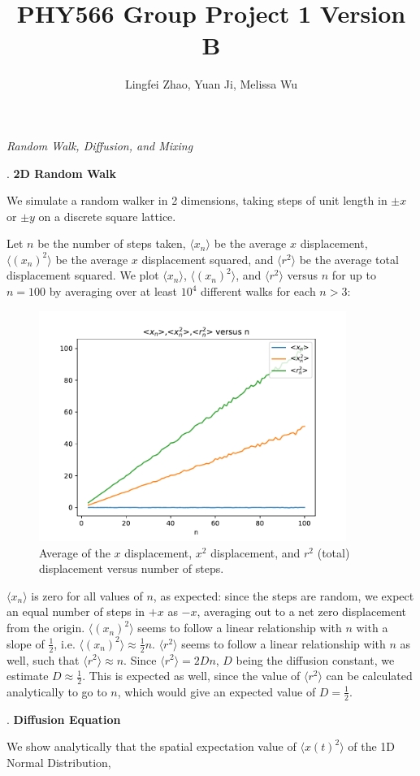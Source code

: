 \documentclass{article}
\begin{document}
\title{PHY566 Group Project 1 Version B}
\author{Lingfei Zhao, Yuan Ji, Melissa Wu}
\maketitle

\begin{center}
\textit{\large Random Walk, Diffusion, and Mixing}\par
\end{center}
. \textbf{2D Random Walk}\par
\smallskip
We simulate a random walker in 2 dimensions, taking steps of unit length in $\pm x$ or $\pm y$ on a discrete square lattice.\par
Let $n$ be the number of steps taken, $\langle x_{n} \rangle$ be the average $x$ displacement, $\langle (x_{n})^{2} \rangle$ be the average $x$ displacement squared, and $\langle r^{2} \rangle$ be the average total displacement squared. We plot $\langle x_{n} \rangle$, $\langle (x_{n})^{2} \rangle$, and $\langle r^{2} \rangle$ versus $n$ for up to $n = 100$ by averaging over at least $10^{4}$ different walks for each $n > 3$:\par
\begin{figure}[H]
\centering
\includegraphics[width=10cm]{P1_Yuan.pdf}
\caption{Average of the $x$ displacement, $x^{2}$ displacement, and $r^{2}$ (total) displacement versus number of steps.}
\end{figure}
$\langle x_{n} \rangle$ is zero for all values of $n$, as expected: since the steps are random, we expect an equal number of steps in $+x$ as $-x$, averaging out to a net zero displacement from the origin. $\langle(x_{n})^{2} \rangle$ seems to follow a linear relationship with $n$ with a slope of $\frac{1}{2}$, i.e. $\langle(x_{n})^{2} \rangle \approx \frac{1}{2}n$. $\langle r^{2} \rangle$ seems to follow a linear relationship with $n$ as well, such that $\langle r^{2} \rangle \approx n$. Since $\langle r^{2} \rangle = 2Dn$, $D$ being the diffusion constant, we estimate $D \approx \frac{1}{2}$. This is expected as well, since the value of $\langle r^{2} \rangle$ can be calculated analytically to go to $n$, which would give an expected value of $D = \frac{1}{2}$.\par
\bigskip
{}. \textbf{Diffusion Equation}\par
\smallskip
We show analytically that the spatial expectation value of $\langle x(t)^{2} \rangle$ of the 1D Normal Distribution,
\end{document}
